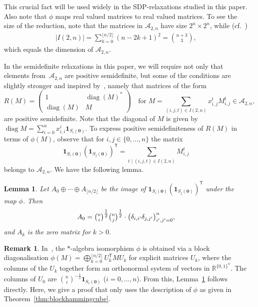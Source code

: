 \documentclass[10pt,a4paper]{article}
\newcommand{\R}{\mathbb{R}}
\newcommand{\one}{\mathbf{1}}
\newtheorem{lemma}[theorem]{Lemma}
\theoremstyle{definition}
\newtheorem{remark}{Remark}[section]
\newcommand{\zero}{\mathbf{0}}
\newcommand{\T}{^{\mathsf{T}}}
\DeclareMathOperator*{\diag}{diag}
\begin{document}
This crucial fact will be used widely in the SDP-relaxations studied in this paper. Also note that $\phi$ maps real valued matrices to real valued matrices. To see the size of the reduction, note that the matrices in $\mathcal{A}_{2,n}$ have size $2^n \times 2^n$, while (cf.~\cite{Sch05})  \begin{align}| I(2,n)|  = \sum_{k=0}^{\lfloor n/2 \rfloor} (n-2k+1)^2= \binom{n+3}{3},\label{dimA2n}\end{align} which equals the dimension of $\mathcal{A}_{2,n}$.

In the semidefinite relaxations in this paper, we will require not only that elements from~$\mathcal{A}_{2,n}$ are positive semidefinite, but some of the conditions are slightly stronger and inspired by~\cite{Laurent}, namely that matrices of the form 
\[
R(M)=\begin{pmatrix} 1 & \diag(M)^*\\ \diag(M) & M \end{pmatrix} \quad \text{for $M=\sum_{(i,j,t)\in I(2,n)} x_{i,j}^t M_{i,j}^t  \in \mathcal{A}_{2,n}$}, 
\] 
are positive semidefinite. Note that the diagonal of $M$ is given by $\diag M=\sum_{i=0}^n x_{i,i}^i \one_{S_i(\zero)}$. To express positive semidefiniteness of $R(M)$ in terms of $\phi(M)$, observe that for $i,j\in \{0,\ldots, n\}$ the matrix 
\[
\one_{S_i(\zero)}(\one_{S_j(\zero)})\T=\sum_{t\mid (i,j,t)\in I(2,n)} M_{i,j}^t
\]
belongs to $\mathcal{A}_{2,n}$. We have the following lemma. 
\begin{lemma}\label{lem:imageofJ}
Let $A_0\oplus\cdots\oplus A_{\lfloor n/2\rfloor}$ be the image of $\one_{S_i(\zero)}(\one_{S_j(\zero)})\T$ under the map $\phi$. Then 
\[
A_{0}=\tbinom{n}{i}^{\tfrac{1}{2}}\tbinom{n}{j}^{\tfrac{1}{2}}\cdot \big(\delta_{i,i'}\delta_{j,j'}\big)_{i',j'=0}^n,
\]
and $A_{k}$ is the zero matrix for $k>0$.
\end{lemma}

\begin{remark}\label{rem:basisvectors} In~\cite{Sch05}, the $*$-algebra isomorphism $\phi$ is obtained via a block diagonalisation $\phi(M)=\bigoplus_{k=0}^{\lfloor n/2\rfloor}U_k\T MU_k$ for explicit matrices $U_k$, where the columns of the $U_k$ together form an orthonormal system of vectors in $\R^{\{0,1\}^n}$. The columns of $U_0$ are $\binom{n}{i}^{-\tfrac{1}{2}}\one_{S_i(\zero)}$ ($i=0,\ldots, n$). From this, Lemma~\ref{lem:imageofJ} follows directly. Here, we give a proof that only uses the description of $\phi$ as given in Theorem~\ref{thm:blockhammingcube}. 
\end{remark}
\end{document}
